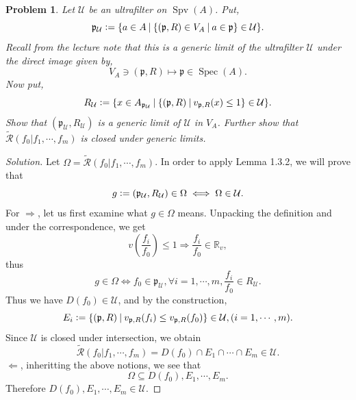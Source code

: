 \documentclass[8pt]{article}
\numberwithin{equation}{section}
\newenvironment{solution}{\begin{proof}[Solution]}{\end{proof}}
\newtheorem{problem}{Problem}[section]
\DeclareMathOperator{\Spec}{Spec}
\DeclareMathOperator{\Spv}{Spv}
\newcommand{\defeq}{\vcentcolon=}
\newcommand{\R}[0]{\mathbb{R}}
\newcommand{\U}[0]{\mathcal{U}}
\newcommand{\cR}[0]{\mathcal{R}}
\newcommand{\sep}[0]{\:|\:}
\newcommand{\p}[0]{\mathfrak{p}}
\begin{document}
\begin{problem}
  Let $\U$ be an ultrafilter on $\Spv(A)$. Put,
  \begin{equation*}
    \p_\U\defeq\{a\in A\sep \{(\p,R)\in V_A\sep a\in\p\}\in\U\}.
  \end{equation*}
  Recall from the lecture note that this is a generic limit of the ultrafilter $\U$ under the direct image given by,
  \begin{equation*}
    V_A\ni (\p,R)\mapsto \p\in\Spec(A).
  \end{equation*}
  Now put,
  \begin{equation*}
    R_\U \defeq \{x\in A_{\p_\U}\sep \{(\p,R)\sep v_{\p,R}(x)\leq 1\}\in\U\}.
  \end{equation*}
  Show that $(\p_\U,R_\U)$ is a generic limit of $\U$ in $V_A$. Further show that $\widetilde{\cR}(f_0|f_1,\cdots,f_m)$ is closed under generic limits.
\end{problem}
\begin{solution}
  Let $\Omega = \widetilde{\cR}(f_0|f_1,\cdots,f_m)$. In order to apply Lemma 1.3.2, we will prove that 
  \begin{equation*}
    g \defeq (\p_\U,R_{\U})\in \Omega\iff\Omega\in\U.
  \end{equation*}
  For $\Rightarrow$, let us first examine what $g\in\Omega$ means. Unpacking the definition and under the correspondence, we get
  \begin{equation*}
   v\left({\frac {f_i} {f_0}}\right)\leq 1\Rightarrow {\frac {f_i} {f_0}}\in\R_v,
  \end{equation*}
  thus 
  \begin{equation*}
    g\in\Omega\iff f_0\in\p_\U, \forall i=1,\cdots,m, {\frac {f_i} {f_0}}\in R_\U.
  \end{equation*}
  Thus we have $D(f_0)\in\U$, and by the construction,
  \begin{equation*}
    E_i \defeq \{(\p,R)\sep v_{\p,R}(f_i)\leq v_{\p,R}(f_0)\}\in\U, (i=1,\cdots,m).
  \end{equation*}
  Since $\U$ is closed under intersection, we obtain 
  \begin{equation*}
    \widetilde{\cR}(f_0|f_1,\cdots,f_m)=D(f_0)\cap E_1\cap\cdots\cap E_m\in\U.
  \end{equation*}
  $\Leftarrow$, inheritting the above notions, we see that 
  \begin{equation*}
    \Omega\subseteq D(f_0),E_1,\cdots,E_m.
  \end{equation*}
  Therefore $D(f_0),E_1,\cdots,E_m\in\U$.  %
\end{solution}
\end{document}
